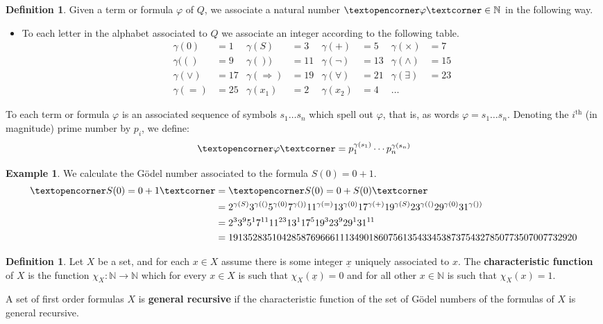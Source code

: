 \documentclass[12pt]{article}
\theoremstyle{plain}
\theoremstyle{definition}
\newtheorem{defn}[thm]{Definition} %
\newtheorem{example}[thm]{Example}
\newcommand{\bb}[1]{\mathbb{#1}}
\newcommand{\adj}[1]{\text{\textopencorner}{#1}\text{\textcorner}}
\newcommand{\lto}{\longrightarrow}
\begin{document}
	\begin{defn}\label{def:godel_numbering}
		Given a term or formula $\varphi$ of $Q$, we associate a natural number $\adj{\varphi} \in \bb{N}$ in the following way.
		\begin{itemize}
			\item To each letter in the alphabet associated to $Q$ we associate an integer according to the following table.
			\begin{align*}
				\gamma(0) &= 1 & \gamma(S) &= 3 & \gamma(+) &= 5 & \gamma(\times) &= 7\\
				\gamma(() &= 9 & \gamma()) &= 11 & \gamma(\neg) &= 13 & \gamma(\wedge) &= 15\\
				\gamma(\vee) &= 17 & \gamma(\Longrightarrow) &= 19 & \gamma(\forall) &= 21 & \gamma(\exists) &= 23\\
				\gamma(=) &= 25 & \gamma(x_1) &= 2 & \gamma(x_2) &= 4 & \hdots
			\end{align*}
		\end{itemize}
		\item To each term or formula $\varphi$ is an associated sequence of symbols $s_1\ldots s_n$ which spell out $\varphi$, that is, as words $\varphi = s_1 \ldots s_n$. Denoting the $i^\text{th}$ (in magnitude) prime number by $p_i$, we define:
		\begin{equation}
			\adj{\varphi} = p_1^{\gamma(s_1)}\cdots p_n^{\gamma(s_n)}
		\end{equation}
	\end{defn}
	\begin{example}
		We calculate the G\"{o}del number associated to the formula $S(0)=0+1$.
		\begin{align*}
			\adj{S(0)=0+1} &= \adj{S(0)=0+S(0)}\\
			&= 2^{\gamma(S)}3^{\gamma(()}5^{\gamma(0)}7^{\gamma())}11^{\gamma(=)}13^{\gamma(0)}17^{\gamma(+)}19^{\gamma(S)}23^{\gamma(()}29^{\gamma(0)}31^{\gamma())}\\
			&= 2^3 3^9 5^1 7^{11} 11^{23} 13^1 17^5 19^3 23^9 29^1 31^{11}\\
			&= 191352835104285876966611134901860756135433453873754327850773507007732920
		\end{align*}
	\end{example}
	
	\begin{defn}
		Let $X$ be a set, and for each $x \in X$ assume there is some integer $\underline{x}$ uniquely associated to $x$. The \textbf{characteristic function} of $X$ is the function $\chi_X: \bb{N} \lto \bb{N}$ which for every $x \in X$ is such that $\chi_X(\underline{x}) = 0$ and for all other $x \in \bb{N}$ is such that $\chi_X(x) = 1$.
		
		A set of first order formulas $X$ is \textbf{general recursive} if the characteristic function of the set of G\"{o}del numbers of the formulas of $X$ is general recursive.
		\end{defn}
	
\end{document}
